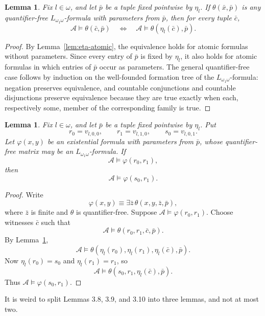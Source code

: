 \documentclass[12pt]{article}
\newtheorem{lemma}[theorem]{Lemma}
\theoremstyle{definition}
\theoremstyle{remark}
\newcommand{\review}[1]{\begin{reviewbox}#1\end{reviewbox}}
\begin{document}
\begin{lemma}\label{lem:eta-qf}
Fix \(l\in\omega\), and let \(\bar p\) be a tuple fixed pointwise by \(\eta_l\).  If \(\theta(\bar x,\bar p)\) is any quantifier-free \(L_{\omega_1\omega}\)-formula with parameters from \(\bar p\), then for every tuple \(\bar c\),
\[
\mathcal A\models \theta(\bar c,\bar p)
\quad\Longleftrightarrow\quad
\mathcal A\models \theta(\eta_l(\bar c),\bar p).
\]
\end{lemma}

\begin{proof}
By Lemma~\ref{lem:eta-atomic}, the equivalence holds for atomic formulas without parameters.  Since every entry of \(\bar p\) is fixed by \(\eta_l\), it also holds for atomic formulas in which entries of \(\bar p\) occur as parameters.  The general quantifier-free case follows by induction on the well-founded formation tree of the \(L_{\omega_1\omega}\)-formula: negation preserves equivalence, and countable conjunctions and countable disjunctions preserve equivalence because they are true exactly when each, respectively some, member of the corresponding family is true.
\end{proof}

\begin{lemma}\label{lem:existential-transfer}
Fix \(l\in\omega\), and let \(\bar p\) be a tuple fixed pointwise by \(\eta_l\).  Put
\[
r_0=v_{l,0,0},\qquad r_1=v_{l,1,0},\qquad s_0=v_{l,0,1}.
\]
Let \(\varphi(x,y)\) be an existential formula with parameters from \(\bar p\), whose quantifier-free matrix may be an \(L_{\omega_1\omega}\)-formula.  If
\[
\mathcal A\models \varphi(r_0,r_1),
\]
then
\[
\mathcal A\models \varphi(s_0,r_1).
\]
\end{lemma}

\begin{proof}
Write
\[
\varphi(x,y)\equiv \exists \bar z\,\theta(x,y,\bar z,\bar p),
\]
where \(\bar z\) is finite and \(\theta\) is quantifier-free.  Suppose \(\mathcal A\models\varphi(r_0,r_1)\).  Choose witnesses \(\bar c\) such that
\[
\mathcal A\models \theta(r_0,r_1,\bar c,\bar p).
\]
By Lemma~\ref{lem:eta-qf},
\[
\mathcal A\models \theta(\eta_l(r_0),\eta_l(r_1),\eta_l(\bar c),\bar p).
\]
Now \(\eta_l(r_0)=s_0\) and \(\eta_l(r_1)=r_1\), so
\[
\mathcal A\models \theta(s_0,r_1,\eta_l(\bar c),\bar p).
\]
Thus \(\mathcal A\models\varphi(s_0,r_1)\).
\end{proof}

\review{It is weird to split Lemmas 3.8, 3.9, and 3.10 into three lemmas, and not at most two.}
\end{document}
